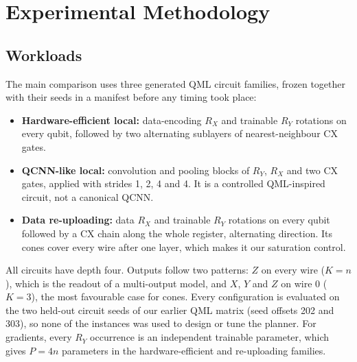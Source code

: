 \section{Experimental Methodology}
\label{sec:method}
\subsection{Workloads}
The main comparison uses three generated QML circuit families, frozen together with their seeds in a manifest before any timing took place:
\begin{itemize}
\item \textbf{Hardware-efficient local:} data-encoding $R_X$ and trainable $R_Y$ rotations on every qubit, followed by two alternating sublayers of nearest-neighbour CX gates.
\item \textbf{QCNN-like local:} convolution and pooling blocks of $R_Y$, $R_X$ and two CX gates, applied with strides 1, 2, 4 and 4. It is a controlled QML-inspired circuit, not a canonical QCNN.
\item \textbf{Data re-uploading:} data $R_X$ and trainable $R_Y$ rotations on every qubit followed by a CX chain along the whole register, alternating direction. Its cones cover every wire after one layer, which makes it our saturation control.
\end{itemize}
All circuits have depth four. Outputs follow two patterns: $Z$ on every wire ($K=n$), which is the readout of a multi-output model, and $X$, $Y$ and $Z$ on wire 0 ($K=3$), the most favourable case for cones. Every configuration is evaluated on the two held-out circuit seeds of our earlier QML matrix (seed offsets 202 and 303), so none of the instances was used to design or tune the planner. For gradients, every $R_Y$ occurrence is an independent trainable parameter, which gives $P=4n$ parameters in the hardware-efficient and re-uploading families.

